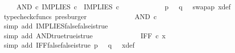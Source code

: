 \begin{isabellebody}
\ \isamarkupfalse%
\ {\isachardoublequoteopen}{\isachardot}{\kern0pt}{\isachardot}{\kern0pt}{\isachardot}{\kern0pt}\ {\isacharequal}{\kern0pt}\ AND\ {\isasymcirc}\isactrlsub c\ {\isasymlangle}IMPLIES\ {\isasymcirc}\isactrlsub c\ {\isasymlangle}{\isasymf}{\isacharcomma}{\kern0pt}{\isasymf}{\isasymrangle}{\isacharcomma}{\kern0pt}\ IMPLIES\ {\isasymcirc}\isactrlsub c\ {\isasymlangle}{\isasymf}{\isacharcomma}{\kern0pt}{\isasymf}{\isasymrangle}{\isasymrangle}{\isachardoublequoteclose}\isanewline
\ \ \ \ \ \ \ \ \ \ \isamarkupfalse%
\ {\isacartoucheopen}p\ {\isacharequal}{\kern0pt}\ {\isasymf}{\isacartoucheclose}\ {\isacartoucheopen}q\ {\isacharequal}{\kern0pt}\ {\isasymf}{\isacartoucheclose}\ swap{\isacharunderscore}{\kern0pt}ap\ x{\isacharunderscore}{\kern0pt}def\ \isamarkupfalse%
\ {\isacharparenleft}{\kern0pt}typecheck{\isacharunderscore}{\kern0pt}cfuncs{\isacharcomma}{\kern0pt}\ presburger{\isacharparenright}{\kern0pt}\isanewline
\ \ \ \ \ \ \ \ \isamarkupfalse%
\ \isamarkupfalse%
\ {\isachardoublequoteopen}{\isachardot}{\kern0pt}{\isachardot}{\kern0pt}{\isachardot}{\kern0pt}\ {\isacharequal}{\kern0pt}\ AND\ {\isasymcirc}\isactrlsub c\ {\isasymlangle}{\isasymt}{\isacharcomma}{\kern0pt}\ {\isasymt}{\isasymrangle}{\isachardoublequoteclose}\isanewline
\ \ \ \ \ \ \ \ \ \ \isamarkupfalse%
\ {\isacharparenleft}{\kern0pt}simp\ add{\isacharcolon}{\kern0pt}\ IMPLIES{\isacharunderscore}{\kern0pt}false{\isacharunderscore}{\kern0pt}false{\isacharunderscore}{\kern0pt}is{\isacharunderscore}{\kern0pt}true{\isacharparenright}{\kern0pt}\isanewline
\ \ \ \ \ \ \ \ \isamarkupfalse%
\ \isamarkupfalse%
\ {\isachardoublequoteopen}{\isachardot}{\kern0pt}{\isachardot}{\kern0pt}{\isachardot}{\kern0pt}\ {\isacharequal}{\kern0pt}\ {\isasymt}{\isachardoublequoteclose}\isanewline
\ \ \ \ \ \ \ \ \ \ \isamarkupfalse%
\ {\isacharparenleft}{\kern0pt}simp\ add{\isacharcolon}{\kern0pt}\ AND{\isacharunderscore}{\kern0pt}true{\isacharunderscore}{\kern0pt}true{\isacharunderscore}{\kern0pt}is{\isacharunderscore}{\kern0pt}true{\isacharparenright}{\kern0pt}\isanewline
\ \ \ \ \ \ \ \ \isamarkupfalse%
\ \isamarkupfalse%
\ {\isachardoublequoteopen}{\isachardot}{\kern0pt}{\isachardot}{\kern0pt}{\isachardot}{\kern0pt}\ {\isacharequal}{\kern0pt}\ IFF\ {\isasymcirc}\isactrlsub c\ x{\isachardoublequoteclose}\isanewline
\ \ \ \ \ \ \ \ \ \ \isamarkupfalse%
\ {\isacharparenleft}{\kern0pt}simp\ add{\isacharcolon}{\kern0pt}\ IFF{\isacharunderscore}{\kern0pt}false{\isacharunderscore}{\kern0pt}false{\isacharunderscore}{\kern0pt}is{\isacharunderscore}{\kern0pt}true\ {\isacartoucheopen}p\ {\isacharequal}{\kern0pt}\ {\isasymf}{\isacartoucheclose}\ {\isacartoucheopen}q\ {\isacharequal}{\kern0pt}\ {\isasymf}{\isacartoucheclose}\ x{\isacharunderscore}{\kern0pt}def{\isacharparenright}{\kern0pt}\isanewline

\end{isabellebody}
